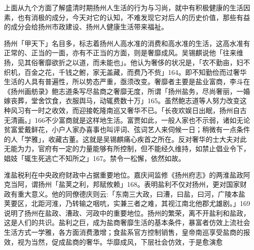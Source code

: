 
上面从九个方面了解盛清时期扬州人生活的行为与习尚，就中有积极健康的生活因素，也有消极的成分，今天对它的认知，不难发现它对后人的历史价值，那些有益的成分会给扬州市政建设、扬州人健康生活带来福祉。

\vfill
\begin{BookNotes}
\end{BookNotes}


扬州「甲天下」名目多，标志着扬州人高水准的消费和高水准的生活，这高水准有正常的、正当的一面，亦有不正当的方面，则是奢靡成风。吴锡麒说他「往来维扬，见其俗奢靡欲折之以道，而未能也」。他认为奢侈的状况是，「农不勤亩，妇不织机，百金之花，千钱之鲋，家无盖藏，而费乃不赀」164。即不知勤俭而过奢华生活的人具有普遍性，所以势态严重，亟须改变。奢靡者主要是盐业富商，李斗在《扬州画舫录》鲍志道条写尽盐商之奢靡无度，所谓「扬州盐务，尽尚奢丽，一婚嫁丧葬，堂舍饮食，衣服舆马，动辄费数十万」165。虽然鲍志道等人努力改变这种风习有一时之收效，而迎接乾隆南巡又奢华不已。「长夜欢娱日出眠，扬州自古无清画。」166不少富商就是这样地生活。富贾如此，一般人家也不示弱，诸如无论贫富爱戴鲜花，小户人家办喜事也叫评词、弦词艺人来伺候一日；稍微有一点条件的人「学雅」，收藏古董。这就是吴锡麒痛心疾首之所在。反对奢华的士大夫对此无能为力，官府有一定的力量能够有所控制，但不能经久维持，如禁止倡业令下，娼妓「辄生死逃亡不知所之」167。禁令一松懈，依然如故。

淮盐税利在中央政府财政中占据重要地位。嘉庆间监修《扬州府志》的两淮盐政阿克当阿，谓扬州「盐荚之利，邦赋攸赖」168。表明盐利不仅对扬州，更对国家财政有重大意义。他的同僚德庆则云:「东南三大政，曰漕，曰盐，曰河，广陵本盐荚要区，北距河淮，乃转输之咽吭，实兼三者之难，其视江南北他郡尤雄剧。」169说明了扬州在盐政、漕政、河政中的重要地位。扬州的繁荣，离不开盐利和盐政，这是人们的共识。盐利之巨，成为盐商奢靡生活的基本条件，暴富者仿效上流社会生活方式一学雅，各方面消费激增；食盐系官方控制销售，皇帝南巡享受盐商的报效，视为当然，促成盐商的奢华。华靡成风，下层社会仿效，于是愈演愈

\vfill
\begin{BookNotes}
\end{BookNotes}

